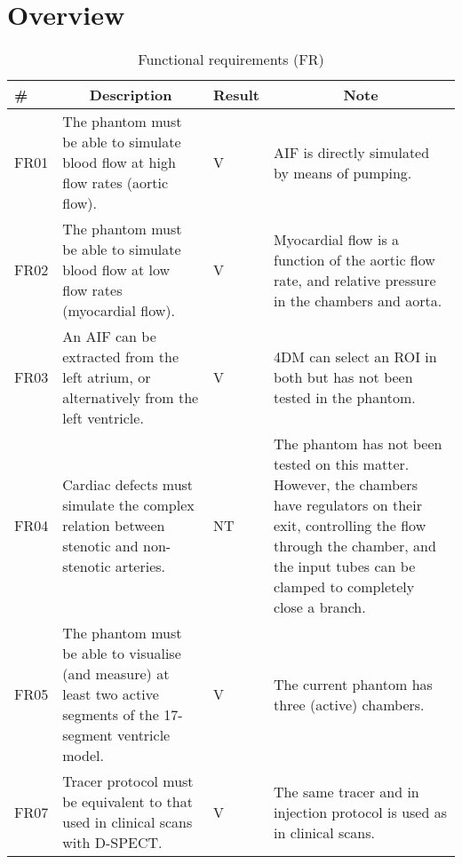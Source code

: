 \newpage
\section{Overview}
\label{sec:requirements}
	\begin{longtable}{m{1.5cm}|m{5.25cm}>{\centering\arraybackslash}m{1cm}m{5.75cm}|}
	\caption{Functional requirements (FR)}
	\label{tab:func_requirements} \\
		\# & \multicolumn{1}{c}{Description} & Result & \multicolumn{1}{c}{Note} \\ \hline
		FR01		& The phantom must be able to simulate blood flow at high flow rates (aortic flow). & \cellcolor{green!50}V & AIF is directly simulated by means of pumping. \\
		FR02		& The phantom must be able to simulate blood flow at low flow rates (myocardial flow). & \cellcolor{green!50}V & Myocardial flow is a function of the aortic flow rate, and relative pressure in the chambers and aorta. \\
		FR03 		& An AIF can be extracted from the left atrium, or alternatively from the left ventricle. & \cellcolor{green!50}V & 4DM can select an ROI in both but has not been tested in the phantom. \\
		FR04		& Cardiac defects must simulate the complex relation between stenotic and non-stenotic arteries. & \cellcolor{blue!50}NT & The phantom has not been tested on this matter. However, the chambers have regulators on their exit, controlling the flow through the chamber, and the input tubes can be clamped to completely close a branch. \\
		FR05 		& The phantom must be able to visualise (and measure) at least two active segments of the 17-segment ventricle model. & \cellcolor{green!50}V & The current phantom has three (active) chambers. \\
		FR07		& Tracer protocol must be equivalent to that used in clinical scans with D-SPECT. & \cellcolor{green!50}V & The same tracer and in injection protocol is used as in clinical scans. \\ \cline{2-4}
		\end{longtable}
		
